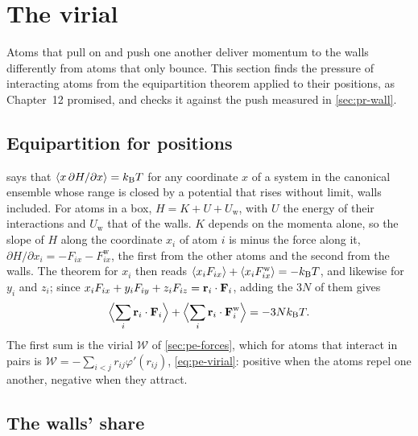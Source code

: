 \section{The virial}
\label{sec:pr-virial}

Atoms that pull on and push one another deliver momentum to the walls
differently from atoms that only bounce. This section finds the pressure
of interacting atoms from the equipartition theorem applied to their
positions, as Chapter~12 promised, and checks it against the push
measured in \cref{sec:pr-wall}.

\subsection*{Equipartition for positions}

 says that $\langle x\,\partial H/\partial x \rangle =
k_{\mathrm{B}} T$ for any coordinate $x$ of a system in the canonical ensemble whose
range is closed by a potential that rises without limit, walls included.
For atoms in a box, $H = K + U + U_{\mathrm w}$, with $U$ the energy of
their interactions and $U_{\mathrm w}$ that of the walls. $K$ depends on
the momenta alone, so the slope of $H$ along the coordinate $x_i$ of atom
$i$ is minus the force along it, $\partial H/\partial x_i = -F_{ix} -
F^{\mathrm w}_{ix}$, the first from the other atoms and the second from
the walls. The theorem for $x_i$ then reads $\langle x_iF_{ix} \rangle +
\langle x_iF^{\mathrm w}_{ix} \rangle = -k_{\mathrm{B}} T$, and likewise for $y_i$ and $z_i$;
since $x_iF_{ix} + y_iF_{iy} + z_iF_{iz} = \bm{\mathrm{r}}_i\cdot\bm{\mathrm{F}}_i$, adding
the $3N$ of them gives
\begin{equation*}
   \Bigl\langle\sum_i\bm{\mathrm{r}}_i\cdot\bm{\mathrm{F}}_i\Bigr\rangle
   + \Bigl\langle\sum_i\bm{\mathrm{r}}_i\cdot\bm{\mathrm{F}}^{\mathrm w}_i\Bigr\rangle
   = -3Nk_{\mathrm{B}} T .
\end{equation*}
The first sum is the virial $\mathcal{W}$ of \cref{sec:pe-forces}, which
for atoms that interact in pairs is $\mathcal{W} = -\sum_{i<j}r_{ij}
\varphi'(r_{ij})$, \cref{eq:pe-virial}: positive when the atoms repel one
another, negative when they attract.

\subsection*{The walls' share}

